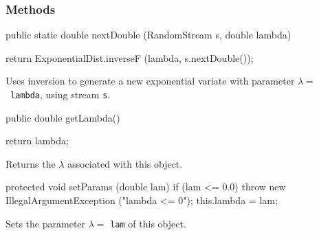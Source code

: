 \subsubsection* {Methods}
\begin{code}
   
   public static double nextDouble (RandomStream s, double lambda) \begin{hide} {
      return ExponentialDist.inverseF (lambda, s.nextDouble());
   }\end{hide}
\end{code}
 \begin{tabb}  Uses inversion to generate a new exponential variate
   with parameter $\lambda = $~\texttt{lambda}, using stream \texttt{s}.
 \end{tabb}
\begin{code}

   public double getLambda()\begin{hide} {
      return lambda;
   }
\end{hide}
\end{code}
\begin{tabb}
   Returns the $\lambda$ associated with this object.
\end{tabb}
\begin{hide}\begin{code}

   protected void setParams (double lam) {
      if (lam <= 0.0)
         throw new IllegalArgumentException ("lambda <= 0");
      this.lambda = lam;
   }
\end{code}
\begin{tabb} Sets the parameter $\lambda = $ \texttt{lam} of this object.
\end{tabb}
\begin{code}
}\end{code}
\end{hide}
